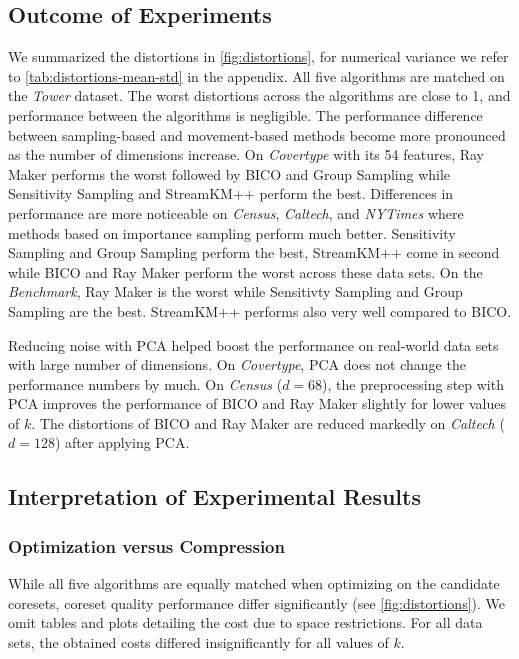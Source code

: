 \subsection{Outcome of Experiments}
We summarized the distortions in \cref{fig:distortions}, for numerical variance we refer to \cref{tab:distortions-mean-std} in the appendix.
All five algorithms are matched on the \textit{Tower} dataset. The worst distortions across the algorithms are close to 1, and performance between the algorithms is negligible. The performance difference between sampling-based and movement-based methods become more pronounced as the number of dimensions increase. On \textit{Covertype} with its 54 features, Ray Maker performs the worst followed by BICO and Group Sampling while Sensitivity Sampling and StreamKM++ perform the best. Differences in performance are more noticeable on \textit{Census}, \textit{Caltech}, and \textit{NYTimes}  where methods based on importance sampling perform much better. Sensitivity Sampling and Group Sampling perform the best, StreamKM++ come in second while BICO and Ray Maker perform the worst across these data sets.
On the \textit{Benchmark}, Ray Maker is the worst while Sensitivty Sampling and Group Sampling are the best. StreamKM++ performs also very well compared to BICO.

Reducing noise with PCA helped boost the performance on real-world data sets with large number of dimensions. On \textit{Covertype}, PCA does not change the performance numbers by much. On \textit{Census} ($d=68$), the preprocessing step with PCA improves the performance of BICO and Ray Maker slightly for lower values of $k$. The distortions of BICO and Ray Maker are reduced markedly on \textit{Caltech} ($d=128$) after applying PCA. 


\subsection{Interpretation of Experimental Results}



\subsubsection*{Optimization versus Compression}
While all five algorithms are equally matched when optimizing on the candidate coresets, coreset quality performance differ significantly (see \cref{fig:distortions}). We omit tables and plots detailing the cost due to space restrictions. For all data sets, the obtained costs differed insignificantly for all values of $k$.

